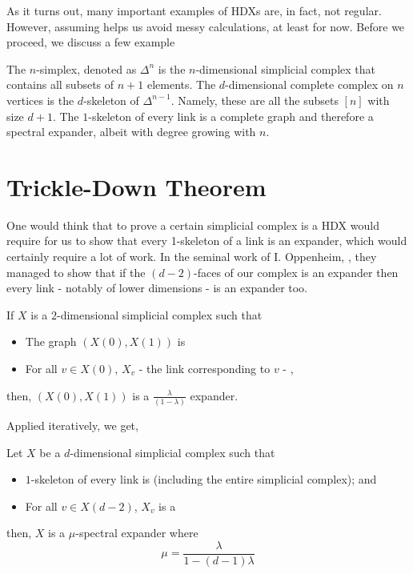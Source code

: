 As it turns out, many important examples of HDXs are, in fact, not regular. However, assuming 
helps us avoid messy calculations, at least for now. Before we proceed, we discuss a few example 

\begin{example}
    The \(n\)-simplex, denoted as \(\Delta^n\) is the \(n\)-dimensional simplicial 
    complex that contains all subsets of \(n+1\) elements. The \(d\)-dimensional 
    complete complex on \(n\) vertices is the \(d\)-skeleton of \(\Delta^{n-1}\).
    Namely, these are all the subsets \([n]\) with size \(d+1\). The 
    \(1\)-skeleton of every link is a complete graph and therefore 
    a spectral expander, albeit with degree growing with \(n\).       
\end{example}


\section{Trickle-Down Theorem}

One would think that to prove a certain simplicial complex is a HDX 
would require for us to show that every 1-skeleton of a link is an expander, which would certainly require 
a lot of work. In the seminal work of I. Oppenheim, \cite{oppenheimLocalSpectralExpansion2018a}, 
they managed to show that if the \((d-2)\)-faces of our complex is an expander 
then every link - notably of lower dimensions - is an expander too.  

\begin{proposition}\label{prop:trickle-down}
    If \(X\) is a \(2\)-dimensional simplicial complex such that 
    \begin{itemize}
        \item The graph \(\left(X(0), X(1)\right)\) is 
        \item For all \(v \in X(0)\), \(X_v\) - the link corresponding to \(v\) - ,  
    \end{itemize}  
    then, \((X(0), X(1))\) is 
        a \(\frac{\lambda}{(1-\lambda)}\) expander.
\end{proposition}

Applied iteratively, we get, 

\begin{theorem}\label{thm:trickle-down}
    Let \(X\) be a \(d\)-dimensional simplicial complex such that 
    \begin{itemize}
        \item \(1\)-skeleton of every link is  (including the entire simplicial complex); and
        \item For all 
        \(v \in X(d-2)\), \(X_v\) is a 
    \end{itemize}
    then, \(X\) is a \(\mu\)-spectral expander where 
    \begin{equation}
        \mu = \frac{\lambda}{1 - (d-1)\lambda}
    \end{equation}  
\end{theorem}

